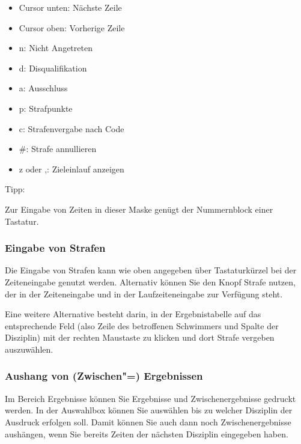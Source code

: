 \documentclass[11pt,a4paper,twoside,ngerman]{article}
\begin{document}
\begin{itemize}

\item Cursor unten: Nächste Zeile


\item Cursor oben: Vorherige Zeile


\item n: Nicht Angetreten


\item d: Disqualifikation


\item a: Ausschluss


\item p: Strafpunkte


\item c: Strafenvergabe nach Code


\item \#: Strafe annullieren


\item z oder ,: Zieleinlauf anzeigen


\end{itemize}
\begin{bfseries}Tipp:\end{bfseries} Zur Eingabe von Zeiten in dieser Maske genügt der Nummernblock einer Tastatur.


\subsubsection*{Eingabe von Strafen}
Die Eingabe von Strafen kann wie oben angegeben über Tastaturkürzel bei der Zeiteneingabe genutzt werden. Alternativ können Sie den Knopf \glqq{}Strafe\grqq{} nutzen, der in der Zeiteneingabe und in der Laufzeiteneingabe zur Verfügung steht.

Eine weitere Alternative besteht darin, in der Ergebnistabelle auf das entsprechende Feld (also Zeile des betroffenen Schwimmers und Spalte der Disziplin) mit der rechten Maustaste zu klicken und dort \glqq{}Strafe vergeben\grqq{} auszuwählen.


\subsubsection*{Aushang von (Zwischen"=) Ergebnissen}
Im Bereich \glqq{}Ergebnisse\grqq{} können Sie Ergebnisse und Zwischenergebnisse gedruckt werden. In der Auswahlbox können Sie auswählen bis zu welcher Disziplin der Ausdruck erfolgen soll. Damit können Sie auch dann noch Zwischenergebnisse aushängen, wenn Sie bereits Zeiten der nächsten Disziplin eingegeben haben.
\end{document}
